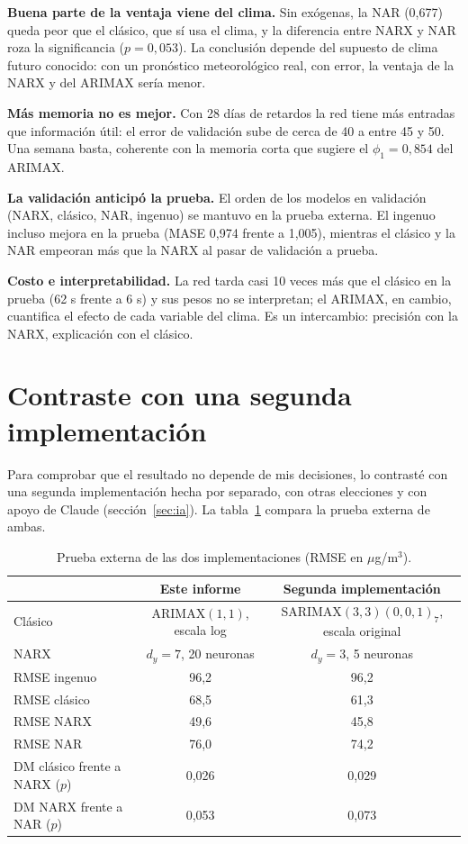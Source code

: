 \documentclass[11pt,letterpaper]{article}
\begin{document}
\textbf{Buena parte de la ventaja viene del clima.} Sin exógenas, la NAR (0,677) queda peor que el clásico, que sí usa el clima, y la diferencia entre NARX y NAR roza la significancia ($p=0{,}053$). La conclusión depende del supuesto de clima futuro conocido: con un pronóstico meteorológico real, con error, la ventaja de la NARX y del ARIMAX sería menor.

\textbf{Más memoria no es mejor.} Con 28 días de retardos la red tiene más entradas que información útil: el error de validación sube de cerca de 40 a entre 45 y 50. Una semana basta, coherente con la memoria corta que sugiere el $\phi_1=0{,}854$ del ARIMAX.

\textbf{La validación anticipó la prueba.} El orden de los modelos en validación (NARX, clásico, NAR, ingenuo) se mantuvo en la prueba externa. El ingenuo incluso mejora en la prueba (MASE 0,974 frente a 1,005), mientras el clásico y la NAR empeoran más que la NARX al pasar de validación a prueba.

\textbf{Costo e interpretabilidad.} La red tarda casi 10 veces más que el clásico en la prueba (62 s frente a 6 s) y sus pesos no se interpretan; el ARIMAX, en cambio, cuantifica el efecto de cada variable del clima. Es un intercambio: precisión con la NARX, explicación con el clásico.

\section{Contraste con una segunda implementación}\label{sec:contraste}

Para comprobar que el resultado no depende de mis decisiones, lo contrasté con una segunda implementación hecha por separado, con otras elecciones y con apoyo de Claude (sección~\ref{sec:ia}). La tabla~\ref{tab:contraste} compara la prueba externa de ambas.

\begin{table}[!htbp]
\centering
\caption{Prueba externa de las dos implementaciones (RMSE en $\mu$g/m$^3$).}\label{tab:contraste}
\small
\begin{tabular}{lcc}
\toprule
& Este informe & Segunda implementación \\
\midrule
Clásico & ARIMAX$(1,1)$, escala log & SARIMAX$(3,3)(0,0,1)_7$, escala original \\
NARX & $d_y=7$, 20 neuronas & $d_y=3$, 5 neuronas \\
\midrule
RMSE ingenuo & 96,2 & 96,2 \\
RMSE clásico & 68,5 & 61,3 \\
RMSE NARX & 49,6 & 45,8 \\
RMSE NAR & 76,0 & 74,2 \\
DM clásico frente a NARX ($p$) & 0,026 & 0,029 \\
DM NARX frente a NAR ($p$) & 0,053 & 0,073 \\
\bottomrule
\end{tabular}
\end{table}
\end{document}
